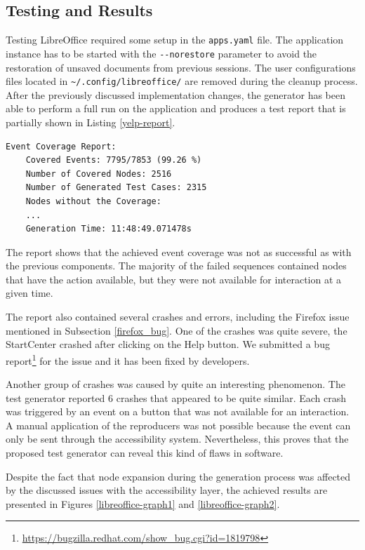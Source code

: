 \subsection{Testing and Results}
Testing LibreOffice required some setup in the \texttt{apps.yaml} file. The application instance has to be started with the \texttt{-{}-norestore} parameter to avoid the restoration of unsaved documents from previous sessions. The user configurations files located in \texttt{\textasciitilde/.config/libreoffice/} are removed during the cleanup process. After the previously discussed implementation changes, the generator has been able to perform a full run on the application and produces a test report that is partially shown in Listing \ref{yelp-report}.

\begin{lstlisting}[caption={Final test generator report for LibreOffice StartCenter},label={yelp-report}]
    Event Coverage Report:
    Covered Events: 7795/7853 (99.26 %) 
    Number of Covered Nodes: 2516
    Number of Generated Test Cases: 2315
    Nodes without the Coverage:
    ...
    Generation Time: 11:48:49.071478s
\end{lstlisting}

The report shows that the achieved event coverage was not as successful as with the previous components. The majority of the failed sequences contained nodes that have the action available, but they were not available for interaction at a given time. 

The report also contained several crashes and errors, including the Firefox issue mentioned in Subsection \ref{firefox_bug}. One of the crashes was quite severe, the StartCenter crashed after clicking on the Help button. We submitted a bug report\footnote{\url{https://bugzilla.redhat.com/show_bug.cgi?id=1819798}} for the issue and it has been fixed by developers. 

Another group of crashes was caused by quite an interesting phenomenon. The test generator reported 6 crashes that appeared to be quite similar. Each crash was triggered by an event on a button that was not available for an interaction. A manual application of the reproducers was not possible because the event can only be sent through the accessibility system. Nevertheless, this proves that the proposed test generator can reveal this kind of flaws in software.

Despite the fact that node expansion during the generation process was affected by the discussed issues with the accessibility layer, the achieved results are presented in Figures \ref{libreoffice-graph1} and \ref{libreoffice-graph2}.

